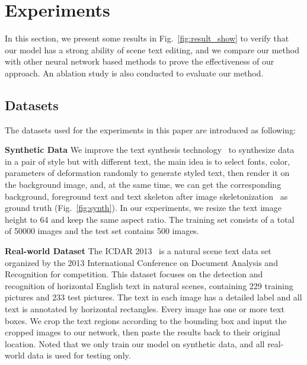 \documentclass[sigconf]{acmart}
\begin{document}
\section{Experiments}
In this section, we present some results in Fig.~\ref{fig:result_show} to verify that our model has a strong ability of scene text editing, and we compare our method with other neural network based methods to prove the effectiveness of our approach. An ablation study is also conducted to evaluate our method.
\subsection{Datasets}
\label{sec:data}
The datasets used for the experiments in this paper are introduced as following:

\textbf{Synthetic Data}  We improve the text synthesis technology~\cite{gupta2016synthetic} to synthesize data in a pair of style but with different text, the main idea is to select fonts, color, parameters of deformation randomly to generate styled text, then render it on the background image, and, at the same time, we can get the corresponding background, foreground text and text skeleton after image skeletonization~\cite{zhang1984fast} as ground truth (Fig.~\ref{fig:synth}). In our experiments, we resize the text image height to 64 and keep the same aspect ratio. The training set consists of a total of 50000 images and the test set contains 500 images.

\textbf{Real-world Dataset} The ICDAR 2013~\cite{karatzas2013icdar} is a natural scene text data set organized by the 2013 International Conference on Document Analysis and Recognition for competition. This dataset focuses on the detection and recognition of horizontal English text in natural scenes, containing 229 training pictures and 233 test pictures. The text in each image has a detailed label and all text is annotated by horizontal rectangles. Every image has one or more text boxes. We crop the text regions according to the bounding box and input the cropped images to our network, then paste the results back to their original location. Noted that we only train our model on synthetic data, and all real-world data is used for testing only.
\end{document}
